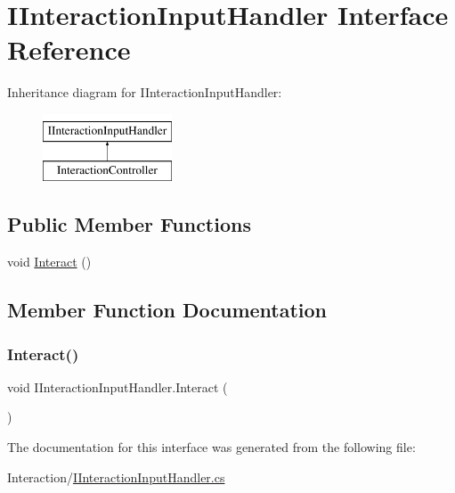 \hypertarget{interface_i_interaction_input_handler}{}\section{I\+Interaction\+Input\+Handler Interface Reference}
\label{interface_i_interaction_input_handler}
Inheritance diagram for I\+Interaction\+Input\+Handler\+:\begin{figure}[H]
\begin{center}
\leavevmode
\includegraphics[height=2.000000cm]{interface_i_interaction_input_handler}
\end{center}
\end{figure}
\subsection*{Public Member Functions}
\begin{DoxyCompactItemize}
\item 
void \mbox{\hyperlink{interface_i_interaction_input_handler_a9423809c5d8c287069e742026807cde6}{Interact}} ()
\end{DoxyCompactItemize}


\subsection{Member Function Documentation}
\mbox{\label{interface_i_interaction_input_handler_a9423809c5d8c287069e742026807cde6}} 
\subsubsection{\texorpdfstring{Interact()}{Interact()}}
{\footnotesize\ttfamily void I\+Interaction\+Input\+Handler.\+Interact (\begin{DoxyParamCaption}{ }\end{DoxyParamCaption})}



The documentation for this interface was generated from the following file\+:\begin{DoxyCompactItemize}
\item 
Interaction/\mbox{\hyperlink{_i_interaction_input_handler_8cs}{I\+Interaction\+Input\+Handler.\+cs}}\end{DoxyCompactItemize}
